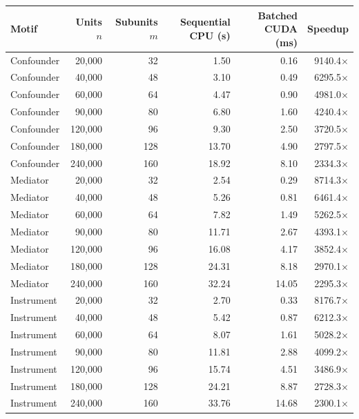 \begin{tabular}{lrrrrr}
\toprule
Motif & Units $n$ & Subunits $m$ & Sequential CPU (s) & Batched CUDA (ms) & Speedup \\
\midrule
Confounder & 20,000 & 32 & 1.50 & 0.16 & 9140.4$\times$ \\
Confounder & 40,000 & 48 & 3.10 & 0.49 & 6295.5$\times$ \\
Confounder & 60,000 & 64 & 4.47 & 0.90 & 4981.0$\times$ \\
Confounder & 90,000 & 80 & 6.80 & 1.60 & 4240.4$\times$ \\
Confounder & 120,000 & 96 & 9.30 & 2.50 & 3720.5$\times$ \\
Confounder & 180,000 & 128 & 13.70 & 4.90 & 2797.5$\times$ \\
Confounder & 240,000 & 160 & 18.92 & 8.10 & 2334.3$\times$ \\
Mediator & 20,000 & 32 & 2.54 & 0.29 & 8714.3$\times$ \\
Mediator & 40,000 & 48 & 5.26 & 0.81 & 6461.4$\times$ \\
Mediator & 60,000 & 64 & 7.82 & 1.49 & 5262.5$\times$ \\
Mediator & 90,000 & 80 & 11.71 & 2.67 & 4393.1$\times$ \\
Mediator & 120,000 & 96 & 16.08 & 4.17 & 3852.4$\times$ \\
Mediator & 180,000 & 128 & 24.31 & 8.18 & 2970.1$\times$ \\
Mediator & 240,000 & 160 & 32.24 & 14.05 & 2295.3$\times$ \\
Instrument & 20,000 & 32 & 2.70 & 0.33 & 8176.7$\times$ \\
Instrument & 40,000 & 48 & 5.42 & 0.87 & 6212.3$\times$ \\
Instrument & 60,000 & 64 & 8.07 & 1.61 & 5028.2$\times$ \\
Instrument & 90,000 & 80 & 11.81 & 2.88 & 4099.2$\times$ \\
Instrument & 120,000 & 96 & 15.74 & 4.51 & 3486.9$\times$ \\
Instrument & 180,000 & 128 & 24.21 & 8.87 & 2728.3$\times$ \\
Instrument & 240,000 & 160 & 33.76 & 14.68 & 2300.1$\times$ \\
\bottomrule
\end{tabular}
